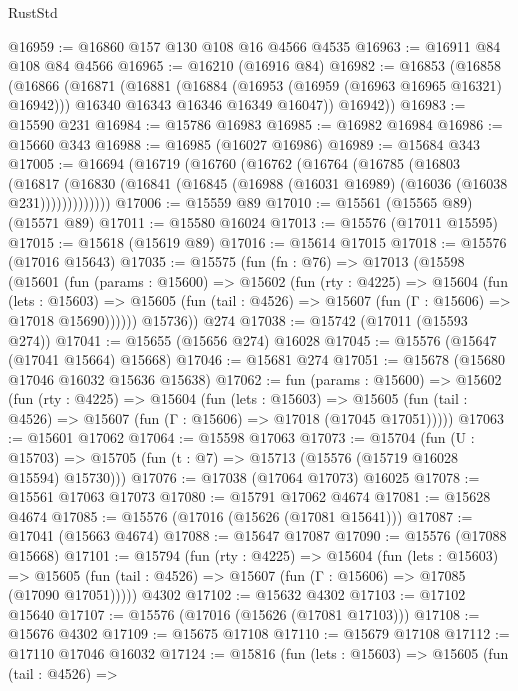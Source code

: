\begin{lexlean}{RustStd}
\begin{coremodule}
@16959 := @16860 @157 @130 @108 @16 @4566 @4535
@16963 := @16911 @84 @108 @84 @4566
@16965 := @16210 (@16916 @84)
@16982 := @16853
    (@16858
      (@16866
        (@16871
          (@16881
            (@16884 (@16953 (@16959 (@16963 @16965 @16321) @16942)))
            @16340
            @16343
            @16346
            @16349
            @16047))
        @16942))
@16983 := @15590 @231
@16984 := @15786 @16983
@16985 := @16982 @16984
@16986 := @15660 @343
@16988 := @16985 (@16027 @16986)
@16989 := @15684 @343
@17005 := @16694
    (@16719
      (@16760
        (@16762
          (@16764
            (@16785
              (@16803
                (@16817
                  (@16830 (@16841 (@16845 (@16988 (@16031 @16989) (@16036 (@16038 @231)))))))))))))
@17006 := @15559 @89
@17010 := @15561 (@15565 @89) (@15571 @89)
@17011 := @15580 @16024
@17013 := @15576 (@17011 @15595)
@17015 := @15618 (@15619 @89)
@17016 := @15614 @17015
@17018 := @15576 (@17016 @15643)
@17035 := @15575
    (fun (fn : @76) =>
    @17013
      (@15598
        (@15601
          (fun (params : @15600) =>
          @15602
            (fun (rty : @4225) =>
            @15604
              (fun (lets : @15603) =>
              @15605 (fun (tail : @4526) => @15607 (fun (Γ : @15606) => @17018 @15690))))))
        @15736))
    @274
@17038 := @15742 (@17011 (@15593 @274))
@17041 := @15655 (@15656 @274) @16028
@17045 := @15576 (@15647 (@17041 @15664) @15668)
@17046 := @15681 @274
@17051 := @15678 (@15680 @17046 @16032 @15636 @15638)
@17062 := fun (params : @15600) =>
  @15602
    (fun (rty : @4225) =>
    @15604
      (fun (lets : @15603) =>
      @15605 (fun (tail : @4526) => @15607 (fun (Γ : @15606) => @17018 (@17045 @17051)))))
@17063 := @15601 @17062
@17064 := @15598 @17063
@17073 := @15704
    (fun (U : @15703) => @15705 (fun (t : @7) => @15713 (@15576 (@15719 @16028 @15594) @15730)))
@17076 := @17038 (@17064 @17073) @16025
@17078 := @15561 @17063 @17073
@17080 := @15791 @17062 @4674
@17081 := @15628 @4674
@17085 := @15576 (@17016 (@15626 (@17081 @15641)))
@17087 := @17041 (@15663 @4674)
@17088 := @15647 @17087
@17090 := @15576 (@17088 @15668)
@17101 := @15794
    (fun (rty : @4225) =>
    @15604
      (fun (lets : @15603) =>
      @15605 (fun (tail : @4526) => @15607 (fun (Γ : @15606) => @17085 (@17090 @17051)))))
    @4302
@17102 := @15632 @4302
@17103 := @17102 @15640
@17107 := @15576 (@17016 (@15626 (@17081 @17103)))
@17108 := @15676 @4302
@17109 := @15675 @17108
@17110 := @15679 @17108
@17112 := @17110 @17046 @16032
@17124 := @15816
    (fun (lets : @15603) =>
    @15605
      (fun (tail : @4526) =>

\end{coremodule}
\end{lexlean}
